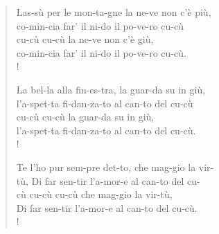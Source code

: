 \documentclass{article}
\begin{document}
\begin{score} 

\end{score}

\begin{verse}

Las-s\`u per le mon-ta-gne la ne-ve non c'\`e pi\`u, \\
co-min-cia far' il ni-do il po-ve-ro cu-c\`u \\ 
cu-c\`u cu-c\`u la ne-ve non c'\`e gi\`u, \\
co-min-cia far' il ni-do il po-ve-ro cu-c\`u. \\!

La bel-la alla fin-es-tra, la guar-da su in gi\`u, \\
l'a-spet-ta fi-dan-za-to al can-to del cu-c\`u \\
 cu-c\`u cu-c\`u  la guar-da su in gi\`u, \\
l'a-spet-ta fi-dan-za-to al can-to del cu-c\`u.  \\!

Te l'ho pur sem-pre det-to, che mag-gio la vir- \\
t\`u, Di far sen-tir l'a-mor-e al can-to del cu- \\
c\`u cu-c\`u cu-c\`u  che mag-gio la vir-t\`u,  \\
Di far sen-tir l'a-mor-e al can-to del cu-c\`u. \\!
\end{verse}
\end{document}

